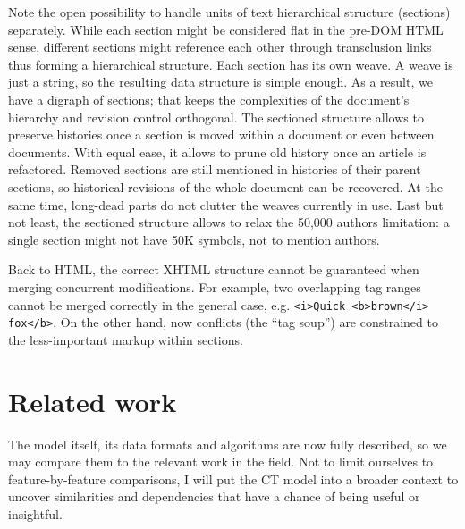 \documentclass{sig-alternate}
\begin{document}
Note the open possibility to handle units of text hierarchical structure (sections) separately.
While each section might be considered flat in the pre-DOM HTML sense, different sections might reference each other through transclusion links thus forming a hierarchical structure.
Each section has its own weave. A weave is just a string, so the resulting data structure is simple enough.
As a result, we have a digraph of sections; that keeps the complexities of the document's hierarchy and revision control orthogonal. 
The sectioned structure allows to preserve histories once a section is moved within a document or even between documents.
With equal ease, it allows to prune old history once an article is refactored.
Removed sections are still mentioned in histories of their parent sections, so historical revisions of the whole document can be recovered. At the same time, long-dead parts do not clutter the weaves currently in use.
Last but not least, the sectioned structure allows to relax the 50,000 authors limitation: a single section might not have 50K symbols, not to mention authors.

Back to HTML, the correct XHTML structure cannot be guaranteed when merging concurrent modifications. For example, two overlapping tag ranges cannot be merged correctly in the general case, e.g. {\small \verb+<i>Quick <b>brown</i> fox</b>+. }
On the other hand, now conflicts (the ``tag soup'') are constrained to the less-important markup within sections.


\section{Related work} \label{sec:reflections}

The model itself, its data formats and algorithms are now fully described, so we may compare them to the relevant work in the field.
Not to limit ourselves to feature-by-feature comparisons, I will put the CT model into a broader context to uncover similarities and dependencies that have a chance of being useful or insightful.
\end{document}
